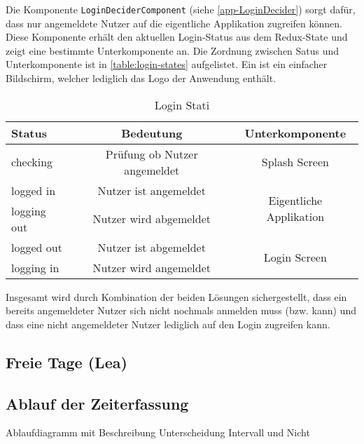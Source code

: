 

Die Komponente \texttt{LoginDeciderComponent} (siehe \autoref{app-LoginDecider}) sorgt dafür,
dass nur angemeldete Nutzer auf die eigentliche Applikation zugreifen können.
Diese Komponente erhält den aktuellen Login-Status aus dem Redux-State und zeigt eine bestimmte Unterkomponente an.
Die Zordnung zwischen Satus und Unterkomponente ist in \autoref{table:login-states} aufgelistet.
Ein  ist ein einfacher Bildschirm, welcher lediglich das Logo der Anwendung enthält.

\begin{table}[h!]
    \centering
     \begin{tabular}{| l | c | c |}
        \hline
        Status      & Bedeutung                      & Unterkomponente \\
        \hline\hline
        checking    & Prüfung ob Nutzer angemeldet   & Splash Screen\\
        \hline
        logged in   & Nutzer ist angemeldet          & \multirow{2}{*}{Eigentliche Applikation}\\
        \cline{1-2}
        logging out & Nutzer wird abgemeldet         & \\
        \hline
        logged out  & Nutzer ist abgemeldet          & \multirow{2}{*}{Login Screen} \\
        \cline{1-2}
        logging in  & Nutzer wird angemeldet         & \\
        \hline
     \end{tabular}
     \caption{Login Stati}
     \label{table:login-states}
\end{table}

Insgesamt wird durch Kombination der beiden Lösungen sichergestellt,
dass ein bereits angemeldeter Nutzer sich nicht nochmals anmelden muss (bzw. kann)
und dass eine nicht angemeldeter Nutzer lediglich auf den Login zugreifen kann.

\subsection{Freie Tage (Lea)}

\subsection{Ablauf der Zeiterfassung}
Ablaufdiagramm mit Beschreibung
Unterscheidung Intervall und Nicht

